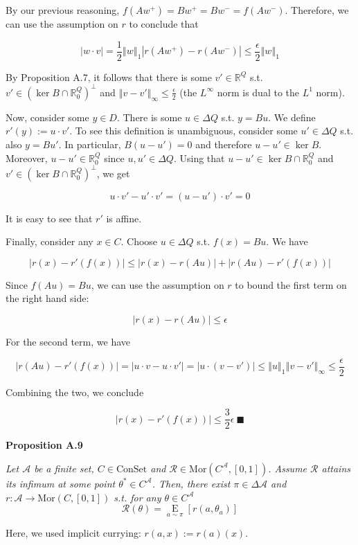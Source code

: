 \documentclass[a4paper]{article}
\newcommand{\Co}[1]{}
\newcommand{\AP}[1]{\left(#1\right)}
\newcommand{\AB}[1]{\left[#1\right]}
\newcommand{\Abs}[1]{\left\vert #1 \right\vert}
\newcommand{\Norm}[1]{\left\Vert #1 \right\Vert}
\newcommand{\Ea}[2]{\underset{#1}{\operatorname{E}}\AB{#2}}
\newcommand{\Reals}{\mathbb{R}}
\DeclareMathOperator{\Ker}{ker}
\newcommand{\Mor}{\mathrm{Mor}}
\newcommand{\A}{\mathcal{A}}
\newcommand{\R}{\mathcal{R}}
\newcommand{\Con}{{\boldsymbol{\mathrm{ConSet}}}}
\begin{document}
By our previous reasoning, $f\AP{Aw^+}=Bw^+=Bw^-=f\AP{Aw^-}$. Therefore, we can use the assumption on $r$ to conclude that

$$\Abs{w\cdot v}=\frac{1}{2}\Norm{w}_1\Abs{r\AP{Aw^+}-r\AP{Aw^-}}\leq\frac{\epsilon}{2}\Norm{w}_1$$

By Proposition A.7, it follows that there is some $v'\in\Reals^Q$ s.t. $v'\in\AP{\Ker B\cap\Reals^Q_0}^\bot$ and $\Norm{v-v'}_\infty\leq\frac{\epsilon}{2}$ (the $L^\infty$ norm is dual to the $L^1$ norm). 

Now, consider some $y\in D$. There is some $u\in\Delta Q$ s.t. $y=Bu$. We define $r'(y):=u\cdot v'$. To see this definition is unambiguous, consider some $u'\in\Delta Q$ s.t. also $y=Bu'$. In particular, $B\AP{u-u'}=0$ and therefore $u-u'\in\Ker B$. Moreover, $u-u'\in\Reals^Q_0$ since $u,u'\in\Delta Q$. Using that $u-u'\in\Ker B\cap\Reals^Q_0$ and $v'\in\AP{\Ker B\cap\Reals^Q_0}^\bot$, we get

$$u\cdot v'-u'\cdot v'=\AP{u-u'}\cdot v'=0$$

It is easy to see that $r'$ is affine. 

Finally, consider any $x\in C$. Choose $u\in\Delta Q$ s.t. $f(x)=Bu$. We have

$$\Big\lvert{r(x)-r'\AP{f(x)}}\Big\rvert\leq\Big\lvert{r(x)-r\AP{Au}}\Big\rvert+\Abs{r\AP{Au}-r'\AP{f(x)}}$$

Since $f\AP{Au}=Bu$, we can use the assumption on $r$ to bound the first term on the right hand side:

$$\Big\lvert{r(x)-r\AP{Au}}\Big\rvert\leq\epsilon$$

For the second term, we have

$$\Abs{r\AP{Au}-r'\AP{f(x)}}=\Big\lvert{u\cdot v-u\cdot v'}\Big\rvert=\Big\lvert{u\cdot\AP{v-v'}}\Big\rvert\leq\Norm{u}_1\Norm{v-v'}_\infty\leq\frac{\epsilon}{2}$$

Combining the two, we conclude

$$\Big\lvert{r(x)-r'\AP{f(x)}}\Big\rvert\leq\frac{3}{2}\epsilon\ \blacksquare$$

\textbf{Proposition A.9}\Co{b}

\textit{Let $\A$ be a finite set, $C\in\Con$ and $\R\in\Mor\AP{C^\A,[0,1]}$. Assume $\R$ attains its infimum at some point $\theta^*\in C^\A$. Then, there exist $\pi\in\Delta\A$ and $r:\A\rightarrow\Mor\AP{C,[0,1]}$ s.t. for any $\theta\in C^\A$}\Co{i} 
$$\R(\theta)=\Ea{a\sim\pi}{r\AP{a,\theta_a}}$$

Here, we used implicit currying: $r(a,x):=r(a)(x)$.
\end{document}
